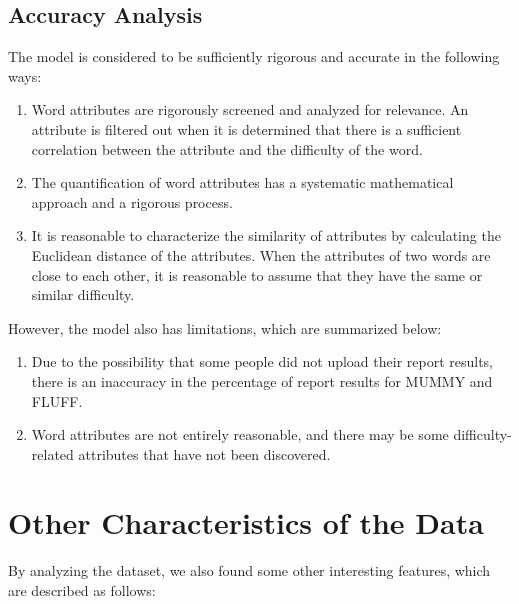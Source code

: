 \documentclass[12pt]{article}  %
\begin{document}
\subsection{Accuracy Analysis}
The model is considered to be sufficiently rigorous and accurate in the following ways:
\begin{enumerate}[\bfseries 1.]
	\setlength{\parsep}{0ex} %
	\setlength{\topsep}{0.5pt} %
	\setlength{\itemsep}{0.5pt} %
	\item Word attributes are rigorously screened and analyzed for relevance. An attribute is filtered out when it is determined that there is a sufficient correlation between the attribute and the difficulty of the word.
	
	\item The quantification of word attributes has a systematic mathematical approach and a rigorous process.
	
	\item It is reasonable to characterize the similarity of attributes by calculating the Euclidean distance of the attributes. When the attributes of two words are close to each other, it is reasonable to assume that they have the same or similar difficulty.
\end{enumerate}

However, the model also has limitations, which are summarized below:

\begin{enumerate}[\bfseries 1.]
	\setlength{\parsep}{0ex} %
	\setlength{\topsep}{0.5pt} %
	\setlength{\itemsep}{0.5pt} %
	\item Due to the possibility that some people did not upload their report results, there is an inaccuracy in the percentage of report results for MUMMY and FLUFF.
	
	\item Word attributes are not entirely reasonable, and there may be some difficulty-related attributes that have not been discovered.
\end{enumerate}

\section{Other Characteristics of the Data}
By analyzing the dataset, we also found some other interesting features, which are described as follows:
\end{document}
